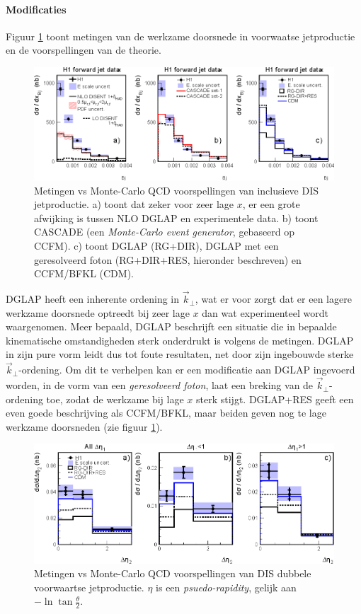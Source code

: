 \documentclass[a4paper,11pt]{article}
\numberwithin{equation}{section} %
\begin{document}
       \paragraph{Modificaties}
Figuur \ref{fig:HERAJets1} toont metingen van de werkzame doorsnede in voorwaatse jetproductie en de voorspellingen van de theorie.
\begin{figure} [H]
  \begin{center}
    \includegraphics[scale=1]{Afbeeldingen/HERAJets1.eps}
    \caption{Metingen vs Monte-Carlo QCD voorspellingen van inclusieve DIS jetproductie. a) toont dat zeker voor zeer lage $x$, er een grote afwijking is tussen NLO DGLAP en experimentele data. b) toont CASCADE  (een \textit{Monte-Carlo event generator}, gebaseerd op CCFM). c) toont DGLAP (RG+DIR), DGLAP met een geresolveerd foton (RG+DIR+RES, hieronder beschreven) en CCFM/BFKL (CDM). \cite{Kiesling}}
   \label{fig:HERAJets1}
  \end{center}
\end{figure}
DGLAP heeft een inherente ordening in $\vec{k}_\perp$, wat er voor zorgt dat er een lagere werkzame doorsnede optreedt bij zeer lage $x$ dan wat experimenteel wordt waargenomen.
Meer bepaald, DGLAP beschrijft een situatie die in bepaalde kinematische omstandigheden \cite[sectie 3.2]{Kiesling} sterk onderdrukt is volgens de metingen.
DGLAP in zijn pure vorm leidt dus tot foute resultaten, net door zijn ingebouwde sterke $\vec{k}_\perp$-ordening.
Om dit te verhelpen kan er een modificatie aan DGLAP ingevoerd worden, in de vorm van een \textit{geresolveerd foton}, laat een breking van de $\vec{k}_\perp$-ordening toe, zodat de werkzame bij lage $x$ sterk stijgt.
DGLAP+RES geeft een even goede beschrijving als CCFM/BFKL, maar beiden geven nog te lage werkzame doorsneden (zie figuur \ref{fig:HERAJets1}).
\begin{figure} [H]
  \begin{center}
    \includegraphics[scale=1]{Afbeeldingen/HERAJets2.eps}
    \caption{Metingen vs Monte-Carlo QCD voorspellingen van DIS dubbele voorwaartse jetproductie. $\eta$ is een \textit{psuedo-rapidity}, gelijk aan $-\ln{\tan{\frac{\theta}{2}}}$. \cite{Kiesling}}
   \label{fig:HERAJets2}
  \end{center}
\end{figure}
\end{document}
